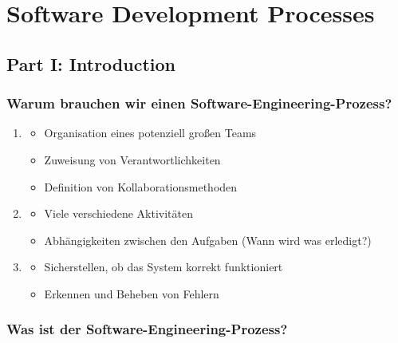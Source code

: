 \section{Software Development Processes}
\subsection{Part I: Introduction}
\subsubsection*{Warum brauchen wir einen Software-Engineering-Prozess?}

    \begin{enumerate}
        \item {}
        \begin{itemize}
            \item Organisation eines potenziell großen Teams
            \item Zuweisung von Verantwortlichkeiten
            \item Definition von Kollaborationsmethoden
        \end{itemize}
        \item {}
        \begin{itemize}
            \item Viele verschiedene Aktivitäten
            \item Abhängigkeiten zwischen den Aufgaben (Wann wird was erledigt?)
        \end{itemize}
        \item {}
        \begin{itemize}
            \item Sicherstellen, ob das System korrekt funktioniert
            \item Erkennen und Beheben von Fehlern
        \end{itemize}
    \end{enumerate}

\subsubsection*{Was ist der Software-Engineering-Prozess?}

